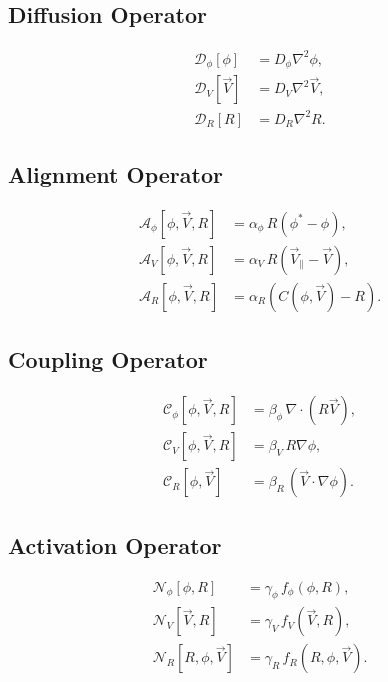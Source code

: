 \documentclass[12pt]{article}
\begin{document}
\subsection{Diffusion Operator}

\begin{align}
    \mathcal{D}_\phi[\phi] &= D_\phi \nabla^2 \phi, \\
    \mathcal{D}_V[\vec{V}] &= D_V \nabla^2 \vec{V}, \\
    \mathcal{D}_R[R] &= D_R \nabla^2 R.
\end{align}

\subsection{Alignment Operator}

\begin{align}
    \mathcal{A}_\phi[\phi, \vec{V}, R] &= \alpha_\phi\, R \left( \phi^\ast - \phi \right), \\
    \mathcal{A}_V[\phi, \vec{V}, R] &= \alpha_V\, R \left( \vec{V}_\parallel - \vec{V} \right), \\
    \mathcal{A}_R[\phi, \vec{V}, R] &= \alpha_R \left( C(\phi, \vec{V}) - R \right).
\end{align}

\subsection{Coupling Operator}

\begin{align}
    \mathcal{C}_\phi[\phi, \vec{V}, R] &= \beta_\phi\, \nabla \cdot (R \vec{V}), \\
    \mathcal{C}_V[\phi, \vec{V}, R] &= \beta_V\, R \nabla \phi, \\
    \mathcal{C}_R[\phi, \vec{V}] &= \beta_R\, \left( \vec{V} \cdot \nabla \phi \right).
\end{align}

\subsection{Activation Operator}

\begin{align}
    \mathcal{N}_\phi[\phi, R] &= \gamma_\phi\, f_\phi(\phi, R), \\
    \mathcal{N}_V[\vec{V}, R] &= \gamma_V\, f_V(\vec{V}, R), \\
    \mathcal{N}_R[R, \phi, \vec{V}] &= \gamma_R\, f_R(R, \phi, \vec{V}).
\end{align}
\end{document}
